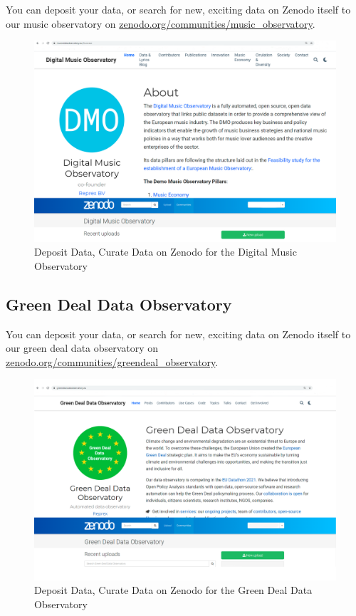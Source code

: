 \documentclass[
  a4paper,
  openany, a4paper, oneside]{book}
\begin{document}
You can deposit your data, or search for new, exciting data on Zenodo itself to our music observatory on \href{https://zenodo.org/communities/music_observatory?page=1\&size=20}{zenodo.org/communities/music\_observatory}.

\begin{figure}

{\centering \includegraphics[width=0.85\linewidth]{plots/screenshots/dmo_and_zenodo} 

}

\caption{Deposit Data, Curate Data on Zenodo for the Digital Music Observatory}\label{fig:dmo-zenodo}
\end{figure}

\hypertarget{green-deal-data-observatory}{%
\subsection{Green Deal Data Observatory}\label{green-deal-data-observatory}}

You can deposit your data, or search for new, exciting data on Zenodo itself to our green deal data observatory on \href{https://zenodo.org/communities/greendeal_observatory?page=1\&size=20}{zenodo.org/communities/greendeal\_observatory}.

\begin{figure}

{\centering \includegraphics[width=0.85\linewidth]{plots/screenshots/greendeal_and_zenodo} 

}

\caption{Deposit Data, Curate Data on Zenodo for the Green Deal Data Observatory}\label{fig:greendeal-zenodo}
\end{figure}
\end{document}
